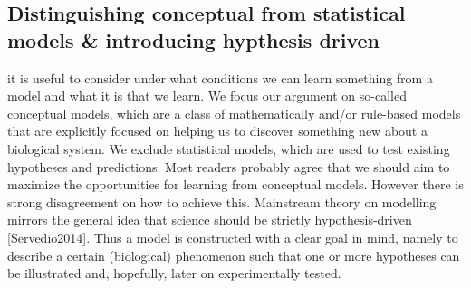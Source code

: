 \subsection{Distinguishing conceptual from statistical models \& introducing hypthesis driven}

it is useful to consider under what conditions we can learn something from a model and what it is that we learn. We focus our argument on so-called conceptual models, which are a class of mathematically and/or rule-based models that are explicitly focused on helping us to discover something new about a biological system. We exclude statistical models, which are used to test existing hypotheses and predictions. Most readers probably agree that we should aim to maximize the opportunities for learning from conceptual models. However there is strong disagreement on how to achieve this. Mainstream theory on modelling mirrors the general idea that science should be strictly hypothesis-driven [Servedio2014]. Thus a model is constructed with a clear goal in mind, namely to describe a certain (biological) phenomenon such that one or more hypotheses can be illustrated and, hopefully, later on experimentally tested.
